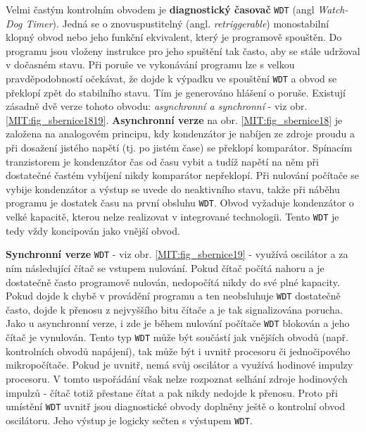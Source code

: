       Velmi častým kontrolním obvodem je \textbf{diagnostický časovač} \texttt{WDT} (angl 
      \emph{Watch-Dog Timer}). Jedná se o znovuspustitelný (angl. \emph{retriggerable}) 
      monostabilní klopný obvod nebo jeho funkční ekvivalent, který je programově spouštěn. Do 
      programu jsou vloženy instrukce pro jeho spuštění  tak často, aby se stále udržoval v 
      dočasném stavu. Při poruše ve vykonávání programu lze s velkou pravděpodobností očekávat, že 
      dojde k výpadku ve spouštění \texttt{WDT} a obvod se překlopí zpět do stabilního stavu. Tím 
      je generováno hlášení o poruše. Existují zásadně dvě verze tohoto obvodu: \emph{asynchronní 
      a synchronní} - viz obr. \ref{MIT:fig_sbernice1819}. \textbf{Asynchronní verze} na obr. 
      \ref{MIT:fig_sbernice18} je založena na analogovém principu, kdy kondenzátor je nabíjen ze 
      zdroje proudu a při dosažení jistého napětí (tj. po jistém čase) se překlopí komparátor. 
      Spínacím tranzistorem je kondenzátor čas od času vybit a tudíž napětí na něm při dostatečné 
      častém vybíjení nikdy komparátor nepřeklopí. Při nulování počítače se vybije kondenzátor a 
      výstup se uvede do neaktivního stavu, takže při náběhu programu je dostatek času na první 
      obsluhu \texttt{WDT}. Obvod vyžaduje kondenzátor o velké kapacitě, kterou nelze realizovat v 
      integrované technologii. Tento \texttt{WDT} je tedy vždy koncipován jako vnější obvod.
      
      \textbf{Synchronní verze} \texttt{WDT} - viz obr. \ref{MIT:fig_sbernice19} - využívá 
      oscilátor a za ním následující čítač se vstupem nulování. Pokud čítač počítá nahoru a je 
      dostatečně často programově nulován, nedopočítá nikdy do své plné kapacity. Pokud dojde k 
      chybě v provádění programu a ten neobsluhuje \texttt{WDT} dostatečně často, dojde k přenosu z 
      nejvyššího bitu čítače a je tak signalizována porucha. Jako u asynchronní verze, i zde je 
      během nulování počítače \texttt{WDT} blokován a jeho čítač je vynulován. Tento typ 
      \texttt{WDT} může být součástí jak vnějších obvodů (např. kontrolních obvodů napájení), tak 
      může být i uvnitř procesoru či jednočipového mikropočítače. Pokud je uvnitř, nemá svůj 
      oscilátor a využívá hodinové impulzy procesoru. V tomto uspořádání však nelze rozpoznat 
      selhání zdroje hodinových impulzů - čítač totiž přestane čítat a pak nikdy nedojde k přenosu. 
      Proto při umístění \texttt{WDT} uvnitř jsou diagnostické obvody doplněny ještě o kontrolní 
      obvod oscilátoru. Jeho výstup je logicky sečten s výstupem \texttt{WDT}.
      
